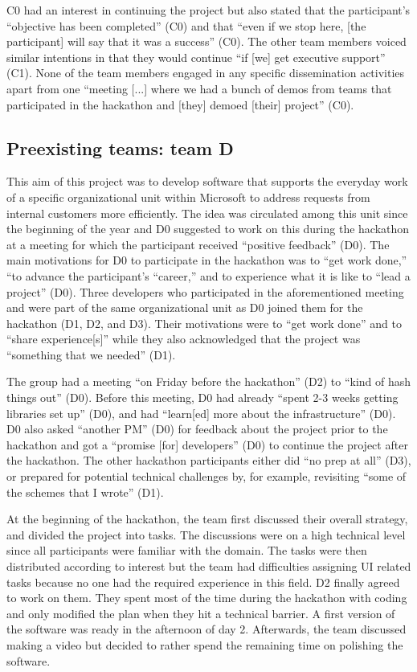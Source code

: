 \documentclass{hcij}
\begin{document}
C0 had an interest in continuing the project but also stated that the participant’s “objective has been completed” (C0) and that “even if we stop here, [the participant] will say that it was a success” (C0). The other team members voiced similar intentions in that they would continue “if [we] get executive support” (C1). None of the team members engaged in any specific dissemination activities apart from one “meeting [...] where we had a bunch of demos from teams that participated in the hackathon and [they] demoed [their] project” (C0).

\subsection{Preexisting teams: team D}
This aim of this project was to develop software that supports the everyday work of a specific organizational unit within Microsoft to address requests from internal customers more efficiently. The idea was circulated among this unit since the beginning of the year and D0 suggested to work on this during the hackathon at a meeting for which the participant received “positive feedback” (D0). The main motivations for D0 to participate in the hackathon was to “get work done,” “to advance the participant’s “career,” and to experience what it is like to “lead a project” (D0). Three developers who participated in the aforementioned meeting and were part of the same organizational unit as D0 joined them for the hackathon (D1, D2, and D3). Their motivations were to “get work done” and to “share experience[s]” while they also acknowledged that the project was “something that we needed” (D1).

The group had a meeting “on Friday before the hackathon” (D2) to “kind of hash things out” (D0). Before this meeting, D0 had already “spent 2-3 weeks getting libraries set up” (D0), and had “learn[ed] more about the infrastructure” (D0). D0 also asked “another PM” (D0) for feedback about the project prior to the hackathon and got a “promise [for] developers” (D0) to continue the project after the hackathon. The other hackathon participants either did “no prep at all” (D3), or prepared for potential technical challenges by, for example, revisiting “some of the schemes that I wrote” (D1).

At the beginning of the hackathon, the team first discussed their overall strategy, and divided the project into tasks. The discussions were on a high technical level since all participants were familiar with the domain. The tasks were then distributed according to interest but the team had difficulties assigning UI related tasks because no one had the required experience in this field. D2 finally agreed to work on them. They spent most of the time during the hackathon with coding and only modified the plan when they hit a technical barrier. A first version of the software was ready in the afternoon of day 2. Afterwards, the team discussed making a video but decided to rather spend the remaining time on polishing the software.
\end{document}
